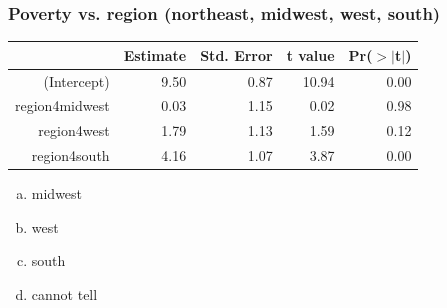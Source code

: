 
\begin{frame}
\frametitle{Poverty vs. region (northeast, midwest, west, south)}


{\small
\begin{center}
\begin{tabular}{rrrrr}
  \hline
 & Estimate & Std. Error & t value & Pr($>$$|$t$|$) \\ 
  \hline
(Intercept) & 9.50 & 0.87 & 10.94 & 0.00 \\ 
region4midwest & 0.03 & 1.15 & 0.02 & 0.98 \\ 
region4west & 1.79 & 1.13 & 1.59 & 0.12 \\ 
region4south & 4.16 & 1.07 & 3.87 & 0.00 \\ 
   \hline
\end{tabular}
\end{center}
}

\begin{enumerate}[(a)]
\item midwest
\item west
\item south
\item cannot tell
\end{enumerate}

\end{frame}
